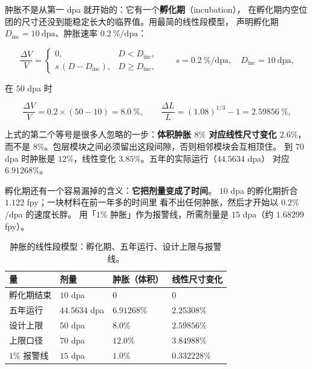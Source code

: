肿胀不是从第一 dpa 就开始的：它有一个\textbf{孵化期}（incubation），
在孵化期内空位团的尺寸还没到能稳定长大的临界值。用最简的线性段模型，
声明孵化期 $D_\mathrm{inc}=10\ \mathrm{dpa}$、肿胀速率 $0.2\ \%/\mathrm{dpa}$：

\begin{equation}
\frac{\Delta V}{V}=
\begin{cases}
0, & D<D_\mathrm{inc},\\[2pt]
s\,(D-D_\mathrm{inc}), & D\ge D_\mathrm{inc},
\end{cases}
\qquad
s=0.2\ \%/\mathrm{dpa},\quad D_\mathrm{inc}=10\ \mathrm{dpa},
\label{eq:app-ay-swell}
\end{equation}

在 $50$ dpa 时

\begin{equation}
\frac{\Delta V}{V}=0.2\times(50-10)=8.0\ \%,
\qquad
\frac{\Delta L}{L}=(1.08)^{1/3}-1=2.59856\ \%,
\label{eq:app-ay-line}
\end{equation}

上式的第二个等号是很多人忽略的一步：\textbf{体积肿胀 $8\%$ 对应线性尺寸变化
$2.6\%$}，而不是 $8\%$。包层模块之间必须留出这段间隙，否则相邻模块会互相顶住。
到 $70$ dpa 时肿胀是 $12\%$，线性变化 $3.85\%$。五年的实际运行（$44.5634$ dpa）
对应 $6.91268\%$。

孵化期还有一个容易漏掉的含义：\textbf{它把剂量变成了时间}。
$10$ dpa 的孵化期折合 $1.122$ fpy；一块材料在前一年多的时间里
看不出任何肿胀，然后才开始以 $0.2\%$/dpa 的速度长胖。
用「$1\%$ 肿胀」作为报警线，所需剂量是 $15$ dpa（约 $1.68299$ fpy）。

\begin{table}[htbp]
\centering
\small
\setlength{\tabcolsep}{4pt}
\caption{肿胀的线性段模型：孵化期、五年运行、设计上限与报警线。}
\label{tab:app-ay-swell}
\begin{tabular}{p{4.4cm}p{2.6cm}p{2.8cm}p{3.4cm}}
\toprule
量 & 剂量 & 肿胀（体积） & 线性尺寸变化 \\
\midrule
孵化期结束 & $10$ dpa & $0$ & $0$ \\
五年运行 & $44.5634$ dpa & $6.91268\%$ & $2.25308\%$ \\
设计上限 & $50$ dpa & $8.0\%$ & $2.59856\%$ \\
上限口径 & $70$ dpa & $12.0\%$ & $3.84988\%$ \\
$1\%$ 报警线 & $15$ dpa & $1.0\%$ & $0.332228\%$ \\
\bottomrule
\end{tabular}

\end{table}

